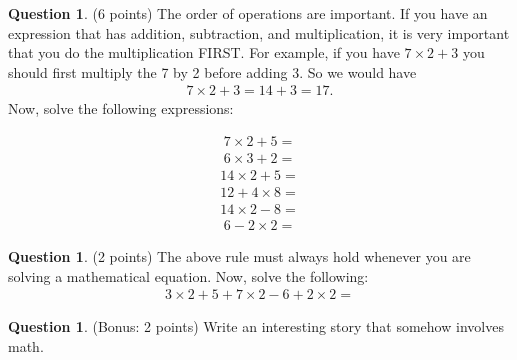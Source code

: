 \documentclass[12pt]{article}
\theoremstyle{definition}
\newtheorem{question}[thm]{Question}
\begin{document}
\begin{question}
	(6 points) The order of operations are important. If you have an expression that has addition, subtraction, and multiplication, it is very important that you do the multiplication FIRST. For example, if you have $7\times 2 + 3$ you should first multiply the 7 by 2 before adding 3. So we would have 
	\begin{align}
	7\times 2 + 3 = 14 + 3 = 17.
	\end{align} 
	Now, solve the following expressions:
	\begin{multicols}{2}
		\noindent
	\begin{align*}
	7 \times 2 + 5 = 
	\end{align*}
	\begin{align*}
	6 \times 3 + 2 = 
	\end{align*}
	\begin{align*}
	14 \times 2 + 5 = 
	\end{align*}
	\begin{align*}
	12 + 4 \times 8 = 
	\end{align*}
	\begin{align*}
	14 \times 2 - 8 = 
	\end{align*}
	\begin{align*}
	6 - 2 \times 2 = 
	\end{align*}
	\end{multicols}
\end{question}

\vspace{1cm}
\begin{question}
	(2 points) The above rule must always hold whenever you are solving a mathematical equation. Now, solve the following:
	\begin{align*}
	3 \times 2 + 5 + 7 \times 2 - 6 + 2 \times 2 = 
	\end{align*}
\end{question}
\vspace{2cm}
\begin{question}
	(Bonus: 2 points) Write an interesting story that somehow involves math.
\end{question}




\end{document}
